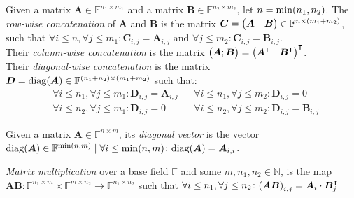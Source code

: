 \begin{definition}
  Given a matrix \(\bm{A} \in \mathbb{F}^{n_1 \times m_1}\) and a matrix 
  \(\bm{B} \in \mathbb{F}^{n_2 \times m_2}\), let \(n = \call{\min}{n_1, n_2}\). 
  The \emph{row-wise concatenation} of \(\bm{A}\) and \(\bm{B}\) is the matrix
  \(\bm{C} = \begin{pmatrix*} \bm{A} & \bm{B} \end{pmatrix*} 
    \in \mathbb{F}^{n \times \Parens*{m_1 + m_2}}\), such that 
  \(\forall i \le n, \forall j \le m_1\colon \bm{C}_{i,j} = \bm{A}_{i,j}\) and
  \(\forall j \le m_2\colon \bm{C}_{i,j} = \bm{B}_{i,j}\).\\
  Their \emph{column-wise concatenation} is the matrix 
  \(\begin{pmatrix*} \bm{A}; \bm{B} \end{pmatrix*} =
    {\begin{pmatrix*} \bm{A}^{\transpose} & \bm{B}^{\transpose} \end{pmatrix*}}^{\transpose}\).\\
  Their \emph{diagonal-wise concatenation} is the matrix 
  \(\bm{D} = \call{\diag}{\bm{A}} \in \mathbb{F}^{\Parens*{n_1+n_2} \times \Parens*{m_1 + m_2}}\) 
  such that:
  \begin{align*}
    &  \forall i \le n_1, \forall j \le m_1\colon \bm{D}_{i,j} = \bm{A}_{i,j}
    && \forall i \le n_1, \forall j \le m_2\colon \bm{D}_{i,j} = 0 \\
    &  \forall i \le n_2, \forall j \le m_1\colon \bm{D}_{i,j} = 0
    && \forall i \le n_2, \forall j \le m_2\colon \bm{D}_{i,j} = \bm{B}_{i,j}
  \end{align*}
\end{definition}

\begin{definition}
  Given a matrix \(\bm{A} \in \mathbb{F}^{n \times m}\), its \emph{diagonal vector} is the 
  vector \(\call{\diag}{\bm{A}} \in \mathbb{F}^{\call{\min}{n, m}} \mid 
  \forall i \le \call{\min}{n, m}\colon \call{\diag}{\bm{A}} = \bm{A}_{i,i}\).
\end{definition}

\begin{definition}
  \emph{Matrix multiplication} over a base field \(\mathbb{F}\) and some 
  \(m, n_1, n_2 \in \mathbb{N}\), is the map
  \(
    \bm{A}\bm{B}\colon 
    \mathbb{F}^{n_1 \times m} \times \mathbb{F}^{m \times n_2} \to \mathbb{F}^{n_1 \times n_2}\) 
    such that 
    \(
    \forall i \le n_1, \forall j \le n_2\colon 
    \Parens*{\bm{A}\bm{B}}_{i,j} = \bm{A}_{i} \cdot \bm{B}^{\transpose}_{j}
  \)
\end{definition}

